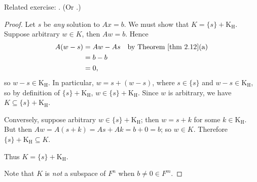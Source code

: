 \begin{note}
Related exercise: . (Or .)
\end{note}

\begin{proof}
Let \(s\) be \emph{any} solution to \(Ax = b\).
We must show that \(K = \{ s \} + \mathrm{K_H}\).
Suppose arbitrary \(w \in K\), then \(Aw = b\).
Hence
\begin{align*}
    A(w - s) & = Aw - As & \text{by \THM{2.12}(a)} \\
             & = b - b \\
             & = 0,
\end{align*}
so \(w - s \in \mathrm{K_H}\).
In particular, \(w = s + (w - s)\), where \(s \in \{ s \}\) and \(w - s \in \mathrm{K_H}\), so by definition of \( \{ s \} + \mathrm{K_H}\), \(w \in \{ s \} + \mathrm{K_H}\).
Since \(w\) is arbitrary, we have \(K \subseteq \{ s \} + \mathrm{K_H}\).

Conversely, suppose arbitrary \(w \in \{ s \} + \mathrm{K_H}\);
then \(w = s + k\) for some \(k \in \mathrm{K_H}\).
But then \(Aw = A(s + k) = As + Ak = b + 0 = b\);
so \(w \in K\).
Therefore \(\{ s \} + \mathrm{K_H} \subseteq K\).

Thus \(K = \{ s \} + \mathrm{K_H}\).

Note that \(K\) is \emph{not} a subspace of \(F^n\) when \(b \ne 0 \in F^m\).
\end{proof}

